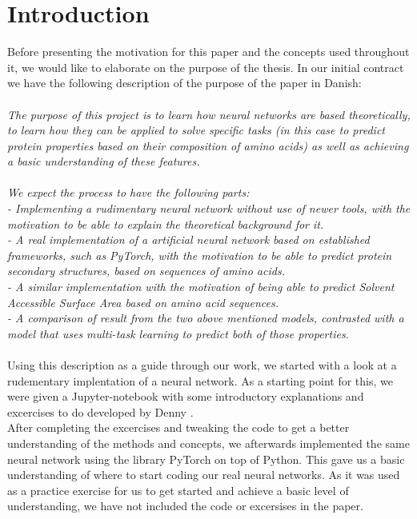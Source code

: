 \section{Introduction}
Before presenting the motivation for this paper and the concepts used throughout it, we would like to elaborate on the purpose of the thesis. In our initial contract we have the following description of the purpose of the paper in Danish:\\\\
\textit{The purpose of this project is to learn how neural networks are based theoretically, to learn how they can be applied to solve specific tasks (in this case to predict protein properties based on their composition of amino acids) as well as achieving a basic understanding of these features. \\\\
We expect the process to have the following parts:\\
- Implementing a rudimentary neural network without use of newer tools, with the motivation to be able to explain the theoretical background for it.\\
- A real implementation of a artificial neural network based on established frameworks, such as PyTorch, with the motivation to be able to predict protein secondary structures, based on sequences of amino acids. \\
- A similar implementation with the motivation of being able to predict Solvent Accessible Surface Area based on amino acid sequences. \\
- A comparison of result from the two above mentioned models, contrasted with a model that uses multi-task learning to predict both of those properties.\\ }\\
Using this description as a guide through our work, we started with a look at a rudementary implentation of a neural network. As a starting point for this, we were given a Jupyter-notebook with some introductory explanations and excercises to do developed by Denny \citeauthor{britz}.\\
After completing the excercises and tweaking the code to get a better understanding of the methods and concepts, we afterwards implemented the same neural network using the library PyTorch on top of Python. 
This gave us a basic understanding of where to start coding our real neural networks. As it was used as a practice exercise for us to get started and achieve a basic level of understanding, we have not included the code or excersises in the paper.

